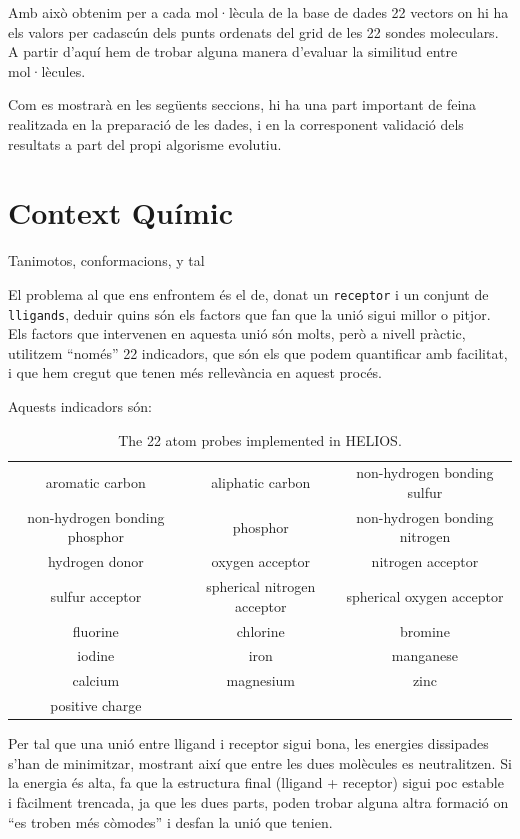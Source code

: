 \documentclass[titlepage,a4paper,12pt]{book}
\begin{document}
Amb això obtenim per a cada mol·lècula de la base de dades 22 vectors on hi ha els valors per cadascún dels punts ordenats del grid de les 22 sondes moleculars. A partir d'aquí hem de trobar alguna manera d'evaluar la similitud entre mol·lècules.

Com es mostrarà en les següents seccions, hi ha una part important de feina
realitzada en la preparació de les dades, i en la corresponent validació dels
resultats a part del propi algorisme evolutiu.


\section{Context Químic} %
\label{sec:Context Quimic}
Tanimotos, conformacions, y tal 

El problema al que ens enfrontem és el de, donat un \texttt{receptor} i un conjunt de %
\texttt{lligands}, deduir quins són els factors que fan que la unió sigui millor
o pitjor.  Els factors que intervenen en aquesta unió són molts, però a nivell
pràctic, utilitzem ``només'' 22 indicadors, que són els que podem quantificar
amb facilitat, i que hem cregut que tenen més rellevància en aquest procés.

Aquests indicadors són:

\begin{table}
\centering
\begin{tabular}{|ccc|}
\hline
aromatic carbon &aliphatic carbon&non-hydrogen bonding sulfur\\
non-hydrogen bonding phosphor&phosphor&non-hydrogen bonding nitrogen\\
hydrogen donor&oxygen acceptor&nitrogen acceptor\\
sulfur acceptor&spherical nitrogen acceptor&spherical oxygen acceptor\\
fluorine&chlorine&bromine\\
iodine&iron&manganese\\
calcium&magnesium&zinc\\
positive charge&& \\
\hline
\end{tabular}
\caption{The 22 atom probes implemented in HELIOS.}
\label{table:maps}
\end{table}

Per tal que una unió entre lligand i receptor sigui bona, les energies
dissipades s'han de minimitzar, mostrant així que entre les dues molècules es
neutralitzen.  Si la energia és alta, fa que la estructura final (lligand +
receptor) sigui poc estable i fàcilment trencada, ja que les dues parts, poden
trobar alguna altra formació on ``es troben més còmodes'' i desfan la unió que
tenien.
\end{document}
